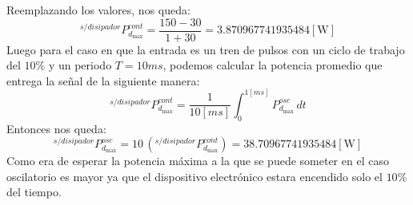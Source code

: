 \documentclass[10pt]{article}
\begin{document}
Reemplazando los valores, nos queda:
\begin{equation}
   ^{s/disipador}P_{d_{\max}}^{cont} = \dfrac{150 - 30}{1 + 30} = 3.870967741935484 [\si{\watt}]
   \label{eq:potencia_max}
\end{equation}
Luego para el caso en que la entrada es un tren de pulsos con un ciclo de trabajo del $10\%$ y un periodo $T=10ms$, podemos calcular la potencia promedio
que entrega la señal de la siguiente manera:
\begin{equation}
   ^{s/disipador}P_{d_{\max}}^{cont}=\frac{1}{10[\si{ms}]}\int_0^{1[\si{ms}]}P_{d_{\max}}^{osc}\,dt
\end{equation}
Entonces nos queda:
\begin{equation}
   ^{s/disipador}P_{d_{\max}}^{osc}=10\,(^{s/disipador}P_{d_{\max}}^{cont})=38.70967741935484[\si{\watt}]
\end{equation}
Como era de esperar la potencia máxima a la que se puede someter en el caso oscilatorio es mayor ya que el dispositivo electrónico estara encendido solo el $10\%$
del tiempo.
\end{document}

